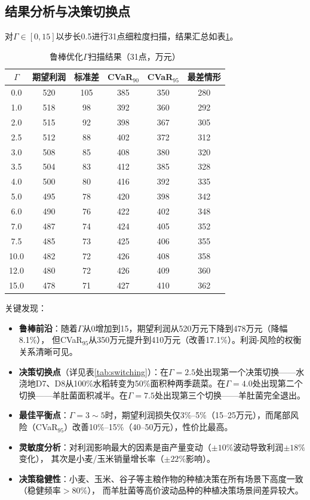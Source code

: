 \documentclass[12pt]{ctexart}
\begin{document}
\subsection{结果分析与决策切换点}

对$\Gamma\in[0,15]$以步长0.5进行31点细粒度扫描，结果汇总如表\ref{tab:gamma_scan}。

\begin{table}[H]
\centering
\caption{鲁棒优化$\Gamma$扫描结果（31点，万元）}
\label{tab:gamma_scan}
\small
\begin{tabular}{@{}cccccc@{}}
\toprule
$\Gamma$ & \textbf{期望利润} & \textbf{标准差} & \textbf{CVaR$_{90}$} & \textbf{CVaR$_{95}$} & \textbf{最差情形} \\
\midrule
0.0 & 520 & 105 & 385 & 350 & 280 \\
1.0 & 518 & 98 & 392 & 360 & 292 \\
2.0 & 515 & 92 & 398 & 367 & 305 \\
2.5 & 512 & 88 & 402 & 372 & 312 \\
3.0 & 508 & 85 & 408 & 380 & 320 \\
3.5 & 504 & 83 & 412 & 385 & 328 \\
4.0 & 500 & 80 & 416 & 392 & 335 \\
5.0 & 495 & 78 & 420 & 398 & 342 \\
6.0 & 490 & 76 & 422 & 402 & 348 \\
7.0 & 487 & 74 & 424 & 405 & 352 \\
7.5 & 485 & 73 & 425 & 406 & 355 \\
10.0 & 482 & 72 & 426 & 408 & 358 \\
12.0 & 480 & 72 & 426 & 409 & 360 \\
15.0 & 478 & 71 & 427 & 410 & 362 \\
\bottomrule
\end{tabular}
\end{table}

\noindent 关键发现：
\begin{itemize}
    \item \textbf{鲁棒前沿}：随着$\Gamma$从0增加到15，期望利润从520万元下降到478万元（降幅8.1\%），
          但CVaR$_{95}$从350万元提升到410万元（改善17.1\%）。利润-风险的权衡关系清晰可见。
    \item \textbf{决策切换点}（详见表\ref{tab:switching}）：在$\Gamma=2.5$处出现第一个决策切换——水浇地D7、D8从100\%水稻转变为50\%面积种两季蔬菜。在$\Gamma=4.0$处出现第二个切换——羊肚菌面积减半。在$\Gamma=7.5$处出现第三个切换——羊肚菌完全退出。
    \item \textbf{最佳平衡点}：$\Gamma=3\sim5$时，期望利润损失仅3\%--5\%（15--25万元），而尾部风险（CVaR$_{95}$）改善10\%--15\%（40--50万元），性价比最高。
    \item \textbf{灵敏度分析}：对利润影响最大的因素是亩产量变动（$\pm10\%$波动导致利润$\pm18\%$变化），
          其次是小麦/玉米销量增长率（$\pm22\%$影响）。
    \item \textbf{决策稳健性}：小麦、玉米、谷子等主粮作物的种植决策在所有场景下高度一致（稳健频率$>80\%$），
          而羊肚菌等高价波动品种的种植决策场景间差异较大。
\end{itemize}
\end{document}
